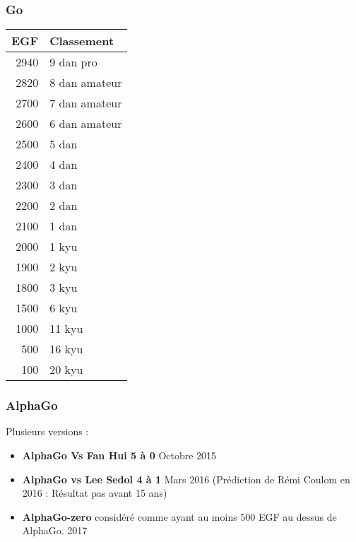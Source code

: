 \begin{frame}
  \frametitle{Go}
  \begin{minipage}[c]{0.7\linewidth}
  \end{minipage}\hfill
  \begin{minipage}[c]{0.26\linewidth}
    \begin{adjustbox}{scale=0.8}
      \begin{tabular}{| r | l |}
        \hline
        EGF & Classement \\ \hline
        2940 & 9 dan pro \\ \hline
        2820 & 8 dan amateur \\ \hline
        2700 & 7 dan amateur \\ \hline
        2600 & 6 dan amateur \\ \hline
        2500 & 5 dan \\ \hline
        2400 & 4 dan \\ \hline
        2300 & 3 dan \\ \hline
        2200 & 2 dan \\ \hline
        2100 & 1 dan \\ \hline
        2000 & 1 kyu \\ \hline
        1900 & 2 kyu \\ \hline
        1800 & 3 kyu \\ \hline
        1500 & 6 kyu \\ \hline
        1000 & 11 kyu \\ \hline
        500 & 16 kyu \\ \hline
        100 & 20 kyu \\ \hline
      \end{tabular}
    \end{adjustbox}
  \end{minipage}\hfill
\end{frame}

\begin{frame}
  \frametitle{AlphaGo}
  Plusieurs versions :
  \begin{itemize}
  \item \textbf{AlphaGo Vs Fan Hui 5 à 0} Octobre 2015
  \item \textbf{AlphaGo vs Lee Sedol 4 à 1} Mars 2016 (Prédiction de Rémi Coulom en 2016 : Résultat pas avant 15 ans)
  \item \textbf{AlphaGo-zero} considéré comme ayant au moins 500 EGF au dessus de AlphaGo. 2017
  \end{itemize}
\end{frame}

